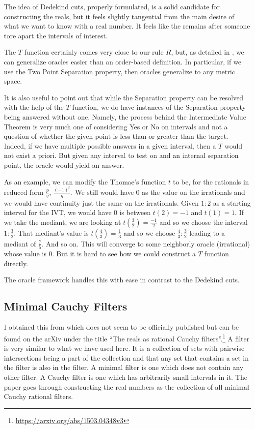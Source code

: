 \documentclass[12pt]{article}
\begin{document}
The idea of Dedekind cuts, properly formulated, is a solid candidate for constructing the reals, but it feels slightly tangential from the main desire of what we want to know with a real number. It feels like the remains after someone tore apart the intervals of interest. 

The $T$ function certainly comes very close to our rule $R$, but, as detailed in \cite{taylor23metric}, we can generalize oracles easier than an order-based definition. In particular, if we use the Two Point Separation property, then oracles generalize to any metric space. 

It is also useful to point out that while the Separation property can be resolved with the help of the $T$ function, we do have instances of the Separation property being answered without one. Namely, the process behind the Intermediate Value Theorem is very much one of considering Yes or No on intervals and not a question of whether the given point is less than or greater than the target. Indeed, if we have multiple possible answers in a given interval, then a $T$ would not exist a priori. But given any interval to test on and an internal separation point, the oracle would yield an answer. 

As an example, we can modify the Thomae's function $t$ to be, for the rationals in reduced form $\frac{p}{q}$, $\frac{(-1)^p}{q}$. We still would have $0$ as the value on the irrationals and we would have continuity just the same on the irrationals. Given $1:2$ as a starting interval for the IVT, we would have $0$ is between $t(2) = -1$ and $t(1) = 1$. If we take the mediant, we are looking at $t(\frac{3}{2}) = \frac{-1}{2}$ and so we choose the interval $1:\frac{3}{2}$. That mediant's value is $t(\frac{4}{3}) = \frac{1}{3}$ and so we choose $\frac{4}{3}:\frac{3}{2}$ leading to a mediant of $\frac{7}{5}$. And so on. This will converge to some neighborly oracle (irrational) whose value is $0$. But it is hard to see how we could construct a $T$ function directly.

The oracle framework handles this with ease in contrast to the Dedekind cuts.

\subsection{Minimal Cauchy Filters}

I obtained this from \cite{weiss2015reals} which does not seem to be officially published but can be found on the arXiv under the title ``The reals as rational Cauchy filters''.\footnote{\url{https://arxiv.org/abs/1503.04348v3}} A filter is very similar to what we have used here. It is a collection of sets with pairwise intersections being a part of the collection and that any set that contains a set in the filter is also in the filter. A minimal filter is one which does not contain any other filter. A Cauchy filter is one which has arbitrarily small intervals in it. The paper goes through constructing the real numbers as the collection of all minimal Cauchy rational filters. 
\end{document}
